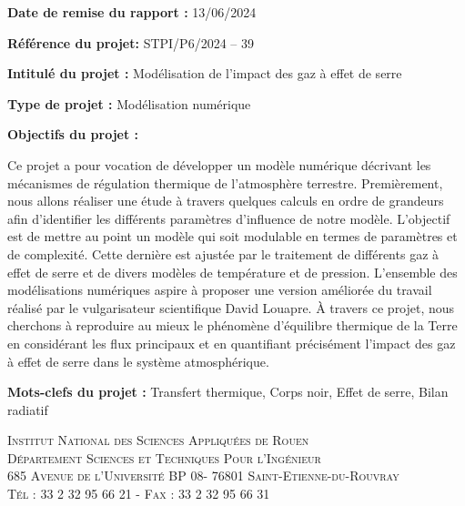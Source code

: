 \documentclass[a4paper, 12pt]{report} %
\begin{document}

\newpage
{}
\setcounter{page}{1}
\thispagestyle{empty}
\null


\newpage
\pagestyle{special}

\textbf{Date de remise du rapport :} 13/06/2024 \vspace{\baselineskip}

\textbf{Référence du projet:} STPI/P6/2024 – 39 \vspace{\baselineskip}

\textbf{Intitulé du projet :} Modélisation de l'impact des gaz à effet de serre \vspace{\baselineskip}

\textbf{Type de projet :} Modélisation numérique \vspace{\baselineskip}

\textbf{Objectifs du projet :} \vspace{\baselineskip} 

Ce projet a pour vocation de développer un modèle numérique
décrivant les mécanismes de régulation thermique de 
l'atmosphère terrestre. Premièrement, nous allons réaliser
une étude à travers quelques calculs en ordre de grandeurs afin
d'identifier les différents paramètres d'influence de notre modèle.
L'objectif est de mettre au point un modèle qui soit modulable
en termes de paramètres et de complexité. Cette dernière est 
ajustée par le traitement de différents gaz à effet de serre 
et de divers modèles de température et de pression. 
L'ensemble des modélisations numériques aspire à proposer 
une version améliorée du travail réalisé par le 
vulgarisateur scientifique David Louapre. À travers ce projet, 
nous cherchons à reproduire au mieux le 
phénomène d'équilibre thermique de la Terre en considérant 
les flux principaux et en quantifiant précisément l'impact
des gaz à effet de serre dans le système atmosphérique. \vspace{\baselineskip}

\textbf{Mots-clefs du projet :} Transfert thermique, Corps noir, Effet de serre, Bilan radiatif \vspace{\baselineskip} 

\vfill


\begin{center}
	\scshape Institut National des Sciences Appliquées de Rouen \\
	Département Sciences et Techniques Pour l'Ingénieur \\
	685 Avenue de l'Université BP 08- 76801 Saint-Etienne-du-Rouvray \\ Tél : 33 2 32 95 66 21 - Fax : 33 2 32 95 66 31
\end{center}
\end{document}
